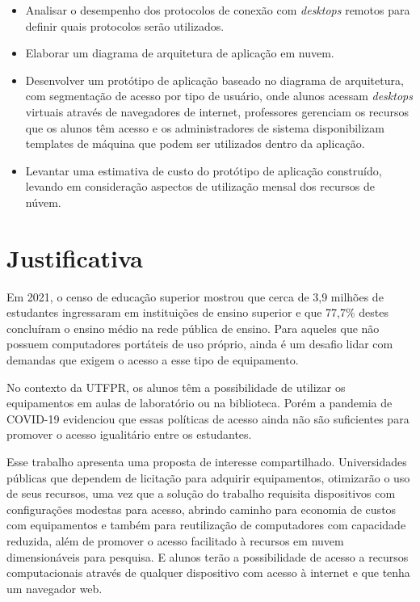 \begin{itemize}
    \item Analisar o desempenho dos protocolos de conexão com \textit{desktops} remotos para definir quais protocolos serão utilizados.

    \item Elaborar um diagrama de arquitetura de aplicação em nuvem.

    \item Desenvolver um protótipo de aplicação baseado no diagrama de arquitetura, com segmentação de acesso por tipo de usuário, onde alunos acessam \textit{desktops} virtuais através de navegadores de internet, professores gerenciam os recursos que os alunos têm acesso e os administradores de sistema disponibilizam templates de máquina que podem ser utilizados dentro da aplicação.

    \item Levantar uma estimativa de custo do protótipo de aplicação construído, levando em consideração aspectos de utilização mensal dos recursos de núvem.
\end{itemize}

\section{Justificativa}\label{sec:justificativa}

Em 2021, o censo de educação superior mostrou que cerca de 3,9 milhões de estudantes ingressaram em instituições de ensino superior e que 77,7\% destes concluíram o ensino médio na rede pública de ensino. \citep{inep2021}
Para aqueles que não possuem computadores portáteis de uso próprio, ainda é um desafio lidar com demandas que exigem o acesso a esse tipo de equipamento.

No contexto da UTFPR, os alunos têm a possibilidade de utilizar os equipamentos em aulas de laboratório ou na biblioteca. Porém a pandemia de COVID-19 evidenciou que essas políticas de acesso ainda não são suficientes para promover o acesso igualitário entre os estudantes.

Esse trabalho apresenta uma proposta de interesse compartilhado. Universidades públicas que dependem de licitação para adquirir equipamentos, otimizarão o uso de seus recursos, uma vez que a solução do trabalho requisita dispositivos com configurações modestas para acesso, abrindo caminho para economia de custos com equipamentos e também para reutilização de computadores com capacidade reduzida, além de promover o acesso facilitado à recursos em nuvem dimensionáveis para pesquisa. E alunos terão a possibilidade de acesso a recursos computacionais através de qualquer dispositivo com acesso à internet e que tenha um navegador web.


